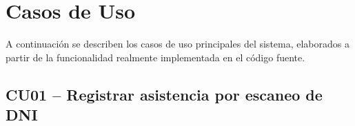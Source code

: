 \documentclass[a4paper,12pt]{article}
\begin{document}
\section{Casos de Uso}

A continuación se describen los casos de uso principales del sistema,
elaborados a partir de la funcionalidad realmente implementada en el código
fuente.

\subsection{CU01 -- Registrar asistencia por escaneo de DNI}
\end{document}
